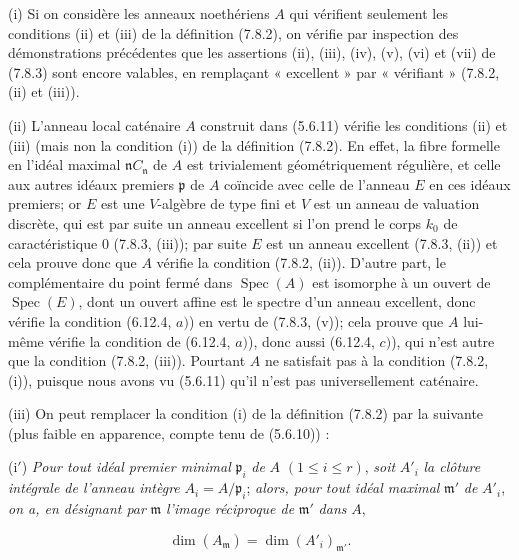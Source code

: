 \begin{remarks}[7.8.4]
\upshape
(i) Si on considère les anneaux noethériens $A$ qui vérifient seulement les
conditions (ii) et (iii) de la définition (7.8.2), on vérifie par inspection
des démonstrations précédentes que les assertions (ii), (iii), (iv), (v), (vi)
et (vii) de (7.8.3) sont encore valables, en remplaçant « excellent » par
« vérifiant » (7.8.2, (ii) et (iii)).

(ii) L'anneau local caténaire $A$ construit dans (5.6.11) vérifie les
conditions (ii) et (iii) (mais non la condition (i)) de la définition (7.8.2).
En effet, la fibre formelle en l'idéal maximal $\mathfrak n C_{\mathfrak n}$ de
$A$ est trivialement géométriquement régulière, et celle aux autres idéaux
premiers $\mathfrak p$ de $A$ coïncide avec celle de l'anneau $E$ en ces idéaux
premiers; or $E$ est une $V$-algèbre de type fini et $V$ est un anneau de
valuation discrète, qui est par suite un anneau excellent si l'on prend le
corps $k_0$ de caractéristique $0$ (7.8.3, (iii)); par suite $E$ est un anneau
excellent (7.8.3, (ii)) et cela prouve donc que $A$ vérifie la condition (7.8.2,
(ii)). D'autre part, le complémentaire du point fermé dans
$\operatorname{Spec}(A)$ est isomorphe à un ouvert de $\operatorname{Spec}(E)$,
dont un ouvert affine est le spectre d'un anneau
excellent, donc vérifie la condition (6.12.4, $a)$) en vertu de (7.8.3, (v));
cela prouve que $A$ lui-même vérifie la condition de (6.12.4, $a)$), donc aussi
(6.12.4, $c)$), qui n'est autre que la condition (7.8.2, (iii)). Pourtant $A$
ne satisfait pas à la condition (7.8.2, (i)), puisque nous avons vu (5.6.11)
qu'il n'est pas universellement caténaire.

(iii) On peut remplacer la condition (i) de la définition (7.8.2) par la
suivante (plus faible en apparence, compte tenu de (5.6.10)) :

(i$'$) \emph{Pour tout idéal premier minimal} $\mathfrak p_i$ \emph{de} $A$
$(1\leq i\leq r)$, \emph{soit} $A'_i$ \emph{la clôture intégrale de l'anneau
intègre} $A_i=A/\mathfrak p_i$; \emph{alors, pour tout idéal maximal}
$\mathfrak m'$ \emph{de} $A'_i$, \emph{on a, en désignant par} $\mathfrak m$
\emph{l'image réciproque de} $\mathfrak m'$ \emph{dans} $A$,
\begin{env}[7.8.4.1]
\label{IV.2.s7.8.4.1-fr}
\[
\dim(A_{\mathfrak m})=\dim(A'_i)_{\mathfrak m'}.
\]
\end{env}


\end{remarks}
